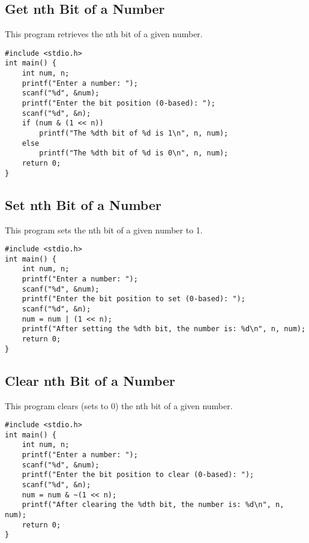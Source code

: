 \documentclass[a4paper,12pt]{article}
\begin{document}
\newpage

\subsection{Get nth Bit of a Number}
This program retrieves the nth bit of a given number.

\begin{lstlisting}[caption={Get nth Bit of a Number}]
#include <stdio.h>
int main() {
    int num, n;
    printf("Enter a number: ");
    scanf("%d", &num);
    printf("Enter the bit position (0-based): ");
    scanf("%d", &n);
    if (num & (1 << n))
        printf("The %dth bit of %d is 1\n", n, num);
    else
        printf("The %dth bit of %d is 0\n", n, num);
    return 0;
}
\end{lstlisting}

\newpage

\subsection{Set nth Bit of a Number}
This program sets the nth bit of a given number to 1.

\begin{lstlisting}[caption={Set nth Bit of a Number}]
#include <stdio.h>
int main() {
    int num, n;
    printf("Enter a number: ");
    scanf("%d", &num);
    printf("Enter the bit position to set (0-based): ");
    scanf("%d", &n);
    num = num | (1 << n);
    printf("After setting the %dth bit, the number is: %d\n", n, num);
    return 0;
}
\end{lstlisting}

\newpage

\subsection{Clear nth Bit of a Number}
This program clears (sets to 0) the nth bit of a given number.

\begin{lstlisting}[caption={Clear nth Bit of a Number}]
#include <stdio.h>
int main() {
    int num, n;
    printf("Enter a number: ");
    scanf("%d", &num);
    printf("Enter the bit position to clear (0-based): ");
    scanf("%d", &n);
    num = num & ~(1 << n);
    printf("After clearing the %dth bit, the number is: %d\n", n, num);
    return 0;
}
\end{lstlisting}
\end{document}
